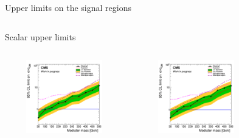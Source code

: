 \documentclass[8pt]{beamer}
\begin{document}
\begin{frame}{Upper limits on the signal regions}
\begin{columns}
\begin{column}{1.09\textwidth}
\begin{block}{\centering Scalar upper limits}\end{block}
\end{column}
\end{columns} \vspace{-5pt}
\begin{columns}
		\begin{column}{0.33\textwidth}
			\begin{center}
			\vspace{-8pt}
			\begin{block}{}\end{block} \vspace{-10pt}
     			\includegraphics[width=1.0\textwidth, height=90pt]{figs/limit_scalar_2016_attempt7.png}
    		\end{center}		
		\end{column} 
		\begin{column}{0.33\textwidth}
			\begin{center}
			\vspace{-8pt}
			\begin{block}{}\end{block} \vspace{-10pt}
     			\includegraphics[width=1.0\textwidth, height=90pt]{figs/limit_scalar_2017_attempt7.png}
    		\end{center}		
		\end{column} 
		\begin{column}{0.33\textwidth}
			\begin{center}
			\vspace{-8pt}

\end{center}
\end{column}
\end{columns}
\end{frame}
\end{document}
